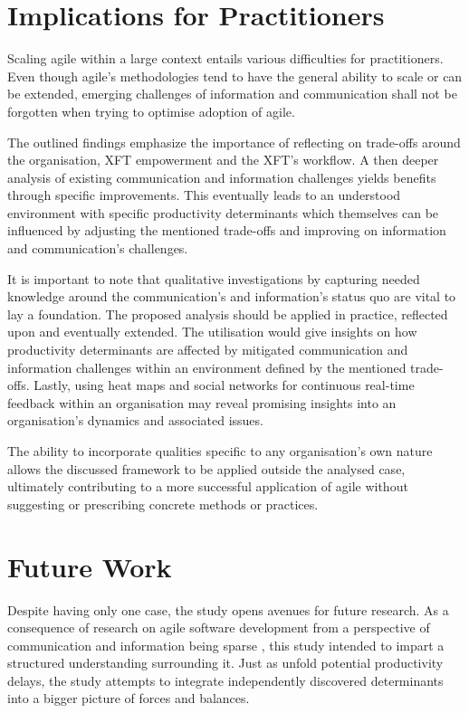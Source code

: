 \section{Implications for Practitioners}

Scaling agile within a large context entails various difficulties for practitioners. Even though agile's methodologies tend to have the general ability to scale or can be extended, emerging challenges of information and communication shall not be forgotten when trying to optimise adoption of agile.  

The outlined findings emphasize the importance of reflecting on trade-offs around the organisation, \ac{XFT} empowerment and the \ac{XFT}'s workflow. A then deeper analysis of existing communication and information challenges yields benefits through specific improvements. This eventually leads to an understood environment with specific productivity determinants which themselves can be influenced by adjusting the mentioned trade-offs and improving on information and communication's challenges.

It is important to note that qualitative investigations by capturing needed knowledge around the communication's and information's status quo are vital to lay a foundation. The proposed analysis should be applied in practice, reflected upon and eventually extended. The utilisation would give insights on how productivity determinants are affected by mitigated communication and information challenges within an environment defined by the mentioned trade-offs. Lastly, using heat maps and social networks for continuous real-time feedback within an organisation may reveal promising insights into an organisation's dynamics and associated issues.

The ability to incorporate qualities specific to any organisation's own nature allows the discussed framework to be applied outside the analysed case, ultimately contributing to a more successful application of agile without suggesting or prescribing concrete methods or practices.

\section{Future Work}

Despite having only one case, the study opens avenues for future research.
As a consequence of research on agile software development from a perspective of communication and information being sparse \citep{pikkarainen2008impactagilecommunication}, this study intended to impart a structured understanding surrounding it. Just as \citet{badampudi2013proddelay} unfold potential productivity delays, the study attempts to integrate independently discovered determinants into a bigger picture of forces and balances.


